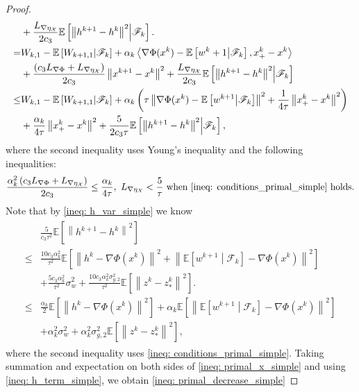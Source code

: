 \documentclass[10pt]{article}
\theoremstyle{remark}
\newcommand{\cX}{\mathcal{X}}
\def\setF{\mathscr{F}} %
\newcommand{\E}{\mathbb{E}}
\newcommand{\norm}[1]{\left\|#1\right\|}
\def\<#1,#2>{\left\langle #1,#2\right\rangle}
\begin{document}
\begin{proof}
\begin{align}
     &+ \frac{L_{\nabla\eta_{\cX}}}{2c_3}\E\left[\norm{h^{k+1} - h^k}^2\middle|\setF_k\right]. \notag\\
    = & W_{k,1} - \E\left[W_{k+1,1}\middle|\setF_k\right] + \alpha_k\<\nabla\Phi(x^k) - \E\left[w^{k+1}\middle|\setF_k\right], x_+^k - x^k> \notag\\
     & + \frac{\left(c_3L_{\nabla \Phi} + L_{\nabla\eta_{\cX}}\right)}{2c_3}\norm{x^{k+1}-x^k}^2 + \frac{L_{\nabla\eta_{\cX}}}{2c_3}\E\left[\norm{h^{k+1} - h^k}^2\middle|\setF_k\right] \notag\\
    \leq & W_{k,1} - \E\left[W_{k+1,1}\middle|\setF_k\right] + \alpha_k\left(\tau\norm{\nabla\Phi(x^k) - \E\left[w^{k+1}\middle|\setF_k\right]}^2 + \frac{1}{4\tau}\norm{ x_+^k - x^k}^2\right) \notag\\
     & + \frac{\alpha_k}{4\tau}\norm{x_+^k-x^k}^2 + \frac{5}{2c_3\tau}\E\left[\norm{h^{k+1} - h^k}^2\middle|\setF_k\right], \label{ineq: primal_x_simple}
\end{align}
where the second inequality uses Young's inequality and the following inequalities:
\[
    \frac{\alpha_k^2\left(c_3L_{\nabla \Phi} + L_{\nabla\eta_{\cX}}\right)}{2c_3}\leq \frac{\alpha_k}{4\tau},\  L_{\nabla \eta_{\cX}}<\frac{5}{\tau} \text{ when }\eqref{ineq: conditions_primal_simple}\ \text{holds}.
\]
Note that by \eqref{ineq: h_var_simple} we know 
\begin{align}\label{ineq: h_term_simple}
    \begin{aligned}
        &\frac{5}{c_3\tau^2}\E\left[\norm{h^{k+1} - h^k}^2\right] \\
        \leq &\frac{10c_3\alpha_k^2}{\tau^2}\E\left[\norm{h^k - \nabla\Phi(x^k)}^2 + \norm{\E\left[w^{k+1}\middle|\setF_k\right] -\nabla\Phi(x^k)}^2\right] \\
         & + \frac{5c_3\alpha_k^2}{\tau^2}\sigma_w^2  + \frac{10c_3\alpha_k^2\sigma_{g,2}^2}{\tau^2}\E\left[\norm{z^k - z_*^k}^2\right]. \\
        \leq &\frac{\alpha_k}{2}\E\left[\norm{h^k - \nabla\Phi(x^k)}^2\right] + \alpha_k\E\left[\norm{\E\left[w^{k+1}\middle|\setF_k\right] -\nabla\Phi(x^k)}^2\right]\\
        & + \alpha_k^2\sigma_w^2 + \alpha_k^2\sigma_{g,2}^2\E\left[\norm{z^k - z_*^k}^2\right],
    \end{aligned}
\end{align}
where the second inequality uses \eqref{ineq: conditions_primal_simple}. Taking summation and expectation on both sides of \eqref{ineq: primal_x_simple} and using \eqref{ineq: h_term_simple}, we obtain \eqref{ineq: primal_decrease_simple}


\end{proof}
\end{document}
